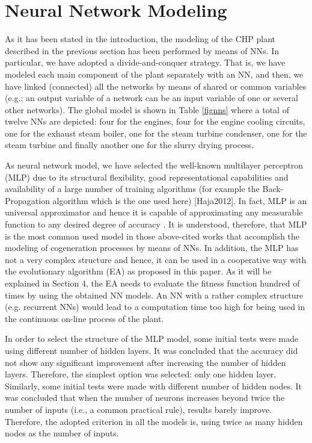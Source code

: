 \section{Neural Network Modeling}
\label{NN}

As it has been stated in the introduction, the modeling of the CHP plant described in the previous section has been performed by means of  NNs. In particular, we have adopted a divide-and-conquer strategy. That is, we have modeled each main component of the plant separately with an NN, and then, we have linked (connected) all the networks by means of shared or common variables (e.g.; an output variable of a network can be an input variable of one or several other networks). The global model is shown in Table \ref{fignns} where a total of twelve NNs are depicted: four for the engines, four for the engine cooling  circuits, one for the exhaust steam boiler, one for the steam turbine condenser, one for the steam turbine and finally another one for the slurry drying process. 

As neural network model, we have selected the well-known multilayer perceptron (MLP) due to its structural flexibility, good representational capabilities and availability of a large number of training algorithms (for example the Back-Propagation algorithm which is the one used here) [Haja2012]. In fact, MLP is an universal approximator and hence it is capable of approximating any measurable function to any desired degree of accuracy \cite{Hornik-1989}. It is understood, therefore, that MLP is the most common used model in those above-cited works that accomplish the modeling of cogeneration processes by means of NNs. In addition, the MLP has not a very complex structure and hence, it can be  used in a cooperative way with the evolutionary algorithm (EA) as proposed in this paper. As it will be explained in Section 4, the EA needs to evaluate the fitness function hundred of times by using the obtained NN models. An NN with a rather complex structure (e.g. recurrent NNs) would lead to a computation time too high for being used in the continuous on-line process of the plant.

In order to select the structure of the MLP model, some initial tests were made using different number of hidden layers. It was concluded that the accuracy did not show any significant improvement after increasing the number of hidden layers. Therefore, the simplest option was selected: only one hidden layer. Similarly, some initial tests were made with different number of hidden nodes. It was concluded that when the number of neurons increases beyond twice the number of inputs (i.e., a common practical rule), results barely improve. Therefore, the adopted criterion in all the models is, using twice as many hidden nodes as the number of inputs.

